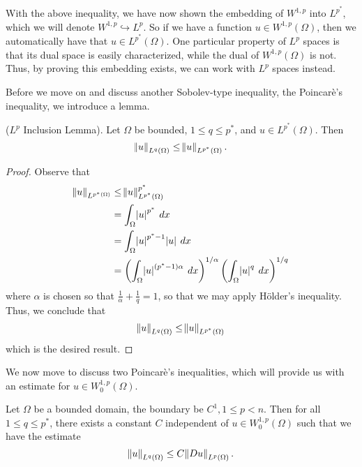 \documentclass[10pt]{article}
\begin{document}
With the above inequality, we have now shown the embedding of $W^{1,p}$ into $L^{p^*}$, which we will denote $W^{1,p} \hookrightarrow L^p$. So if we have a function $u \in W^{1,p}(\Omega)$, then we automatically have that $u \in L^{p^{*}}(\Omega)$. One particular property of $L^p$ spaces is that its dual space is easily characterized, while the dual of $W^{1,p}(\Omega)$ is not. Thus, by proving this embedding exists, we can work with $L^p$ spaces instead. 

Before we move on and discuss another Sobolev-type inequality, the Poincar\`e's inequality, we introduce a lemma. 
\begin{lemma}
	($L^p$ Inclusion Lemma). Let $\Omega$ be bounded, $1 \leq q \leq p^*$, and $u \in L^{p^*}(\Omega)$. Then 
	\begin{equation*}
		\displaystyle \norm{u}_{L^q(\Omega)} \leq \norm{u}_{L^{p^*}(\Omega)}.
	\end{equation*} 
\end{lemma}
\begin{proof}
	Observe that 
	\begin{align*}
		\displaystyle \norm{u}_{L^{p^*(\Omega)}} &\leq \norm{u}_{L^{p^*}(\Omega)}^{p^*} \\
		&= \int_{\Omega}{\abs{u}^{p^*} \: dx} \\
		&= \int_{\Omega}{\abs{u}^{p^*-1}\abs{u} \: dx} \\
		&= \left(\int_{\Omega}{\abs{u}^{(p^*-1)\alpha} \: dx}\right)^{1/\alpha} \left(\int_{\Omega}{\abs{u}^{q} \: dx}\right)^{1/q}
	\end{align*}
	where $\alpha$ is chosen so that $\frac{1}{\alpha} + \frac{1}{q} = 1$, so that we may apply H\"older's inequality. Thus, we conclude that 
	\begin{equation*}
		\displaystyle \norm{u}_{L^q(\Omega)} \leq \norm{u}_{L^{p^*}(\Omega)}
	\end{equation*}
	which is the desired result. 
\end{proof}
We now move to discuss two Poincar\`e's inequalities, which will provide us with an estimate for $u \in W^{1,p}_0(\Omega)$. 
\begin{theorem}
	Let $\Omega$ be a bounded domain, the boundary be $C^1, 1 \leq p < n$. Then for all $1 \leq q \leq p^*$, there exists a constant $C$ independent of $u \in W^{1,p}_0(\Omega)$ such that we have the estimate
	\begin{equation*}
		\displaystyle \norm{u}_{L^q(\Omega)} \leq C \norm{Du}_{L^p(\Omega)}. 
	\end{equation*}
\end{theorem}
\end{document}
